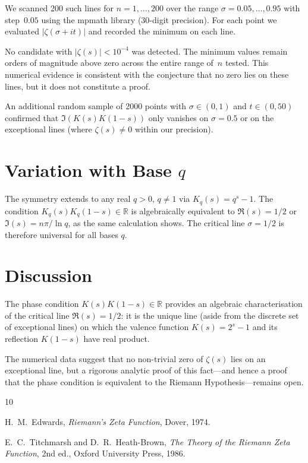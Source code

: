 \documentclass[12pt,a4paper]{article}
\theoremstyle{plain}
\begin{document}
We scanned 200 such lines for $n=1,\dots,200$ over the range
$\sigma=0.05,\dots,0.95$ with step~$0.05$ using the mpmath library
(30-digit precision).  For each point we evaluated
$|\zeta(\sigma+it)|$ and recorded the minimum on each line.

No candidate with $|\zeta(s)|<10^{-4}$ was detected.  The minimum
values remain orders of magnitude above zero across the entire
range of~$n$ tested.  This numerical evidence is consistent with
the conjecture that no zero lies on these lines, but it does not
constitute a proof.

An additional random sample of 2000 points with
$\sigma\in(0,1)$ and $t\in(0,50)$ confirmed that
$\Im(K(s)K(1-s))$ only vanishes on $\sigma=0.5$ or on the
exceptional lines (where $\zeta(s)\neq0$ within our precision).

\section{Variation with Base $q$}
\label{sec:q}

The symmetry extends to any real $q>0$, $q\neq1$ via
$K_q(s)=q^s-1$.  The condition $K_q(s)K_q(1-s)\in\mathbb{R}$
is algebraically equivalent to $\Re(s)=1/2$ or
$\Im(s)=n\pi/\ln q$, as the same calculation shows.  The critical
line $\sigma=1/2$ is therefore universal for all bases $q$.

\section{Discussion}
\label{sec:conc}

The phase condition $K(s)K(1-s)\in\mathbb{R}$ provides an
algebraic characterisation of the critical line $\Re(s)=1/2$:
it is the unique line (aside from the discrete set of exceptional
lines) on which the valence function $K(s)=2^s-1$ and its
reflection $K(1-s)$ have real product.

The numerical data suggest that no non-trivial zero of $\zeta(s)$
lies on an exceptional line, but a rigorous analytic proof of
this fact---and hence a proof that the phase condition is
equivalent to the Riemann Hypothesis---remains open.

\begin{thebibliography}{10}

 H.~M.~Edwards,
  {\it Riemann's Zeta Function}, Dover, 1974.

 E.~C.~Titchmarsh and D.~R.~Heath-Brown,
  {\it The Theory of the Riemann Zeta Function},
  2nd ed., Oxford University Press, 1986.

\end{thebibliography}
\end{document}
